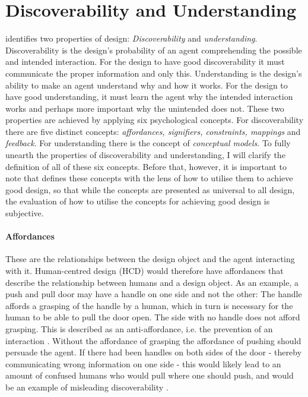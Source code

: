 \section{Discoverability and Understanding}
 identifies two properties of design: \textit{Discoverability} and \textit{understanding}. Discoverability is the design's probability of an agent comprehending the possible and intended interaction. For the design to have good discoverability it must communicate the proper information and only this. Understanding is the design's ability to make an agent understand why and how it works. For the design to have good understanding, it must learn the agent why the intended interaction works and perhaps more important why the unintended does not. These two properties are achieved by applying six psychological concepts. For discoverability there are five distinct concepts: \textit{affordances, signifiers, constraints, mappings} and \textit{feedback}. For understanding there is the concept of \textit{conceptual models}. To fully unearth the properties of discoverability and understanding, I will clarify the definition of all of these six concepts. Before that, however, it is important to note that  defines these concepts with the lens of how to utilise them to achieve good design, so that while the concepts are presented as universal to all design, the evaluation of how to utilise the concepts for achieving good design is subjective.

\paragraph{Affordances} These are the relationships between the design object and the agent interacting with it. Human-centred design (HCD) would therefore have affordances that describe the relationship between humans and a design object. As an example, a push and pull door may have a handle on one side and not the other: The handle affords a grasping of the handle by a human, which in turn is necessary for the human to be able to pull the door open. The side with no handle does not afford grasping. This is described as an anti-affordance, i.e. the prevention of an interaction \cite{norman}. Without the affordance of grasping the affordance of pushing should persuade the agent. If there had been handles on both sides of the door - thereby communicating wrong information on one side - this would likely lead to an amount of confused humans who would pull where one should push, and would be an example of misleading discoverability \cite{norman}.

